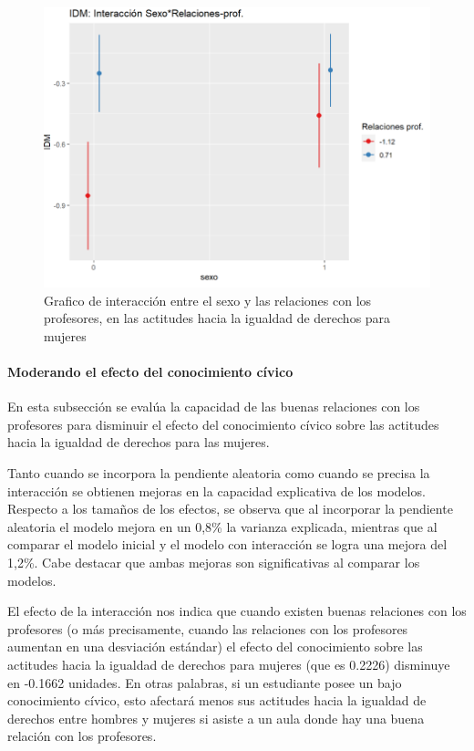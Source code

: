 \documentclass[12pt,twoside]{templates/facsothesis}
\begin{document}
\begin{figure}[H]

{\centering \includegraphics[width=0.9\linewidth]{input/images/PLOTINT1} 

}

\caption{Grafico de interacción entre el sexo y las relaciones con los profesores, en las actitudes hacia la igualdad de derechos para mujeres}\label{fig:unnamed-chunk-12}
\end{figure}

\newpage

\hypertarget{moderando-el-efecto-del-conocimiento-cuxedvico}{%
\paragraph{Moderando el efecto del conocimiento cívico}\label{moderando-el-efecto-del-conocimiento-cuxedvico}}

En esta subsección se evalúa la capacidad de las buenas relaciones con los profesores para disminuir el efecto del conocimiento cívico sobre las actitudes hacia la igualdad de derechos para las mujeres.

Tanto cuando se incorpora la pendiente aleatoria como cuando se precisa la interacción se obtienen mejoras en la capacidad explicativa de los modelos. Respecto a los tamaños de los efectos, se observa que al incorporar la pendiente aleatoria el modelo mejora en un 0,8\% la varianza explicada, mientras que al comparar el modelo inicial y el modelo con interacción se logra una mejora del 1,2\%. Cabe destacar que ambas mejoras son significativas al comparar los modelos.

El efecto de la interacción nos indica que cuando existen buenas relaciones con los profesores (o más precisamente, cuando las relaciones con los profesores aumentan en una desviación estándar) el efecto del conocimiento sobre las actitudes hacia la igualdad de derechos para mujeres (que es 0.2226) disminuye en -0.1662 unidades. En otras palabras, si un estudiante posee un bajo conocimiento cívico, esto afectará menos sus actitudes hacia la igualdad de derechos entre hombres y mujeres si asiste a un aula donde hay una buena relación con los profesores.
\end{document}
